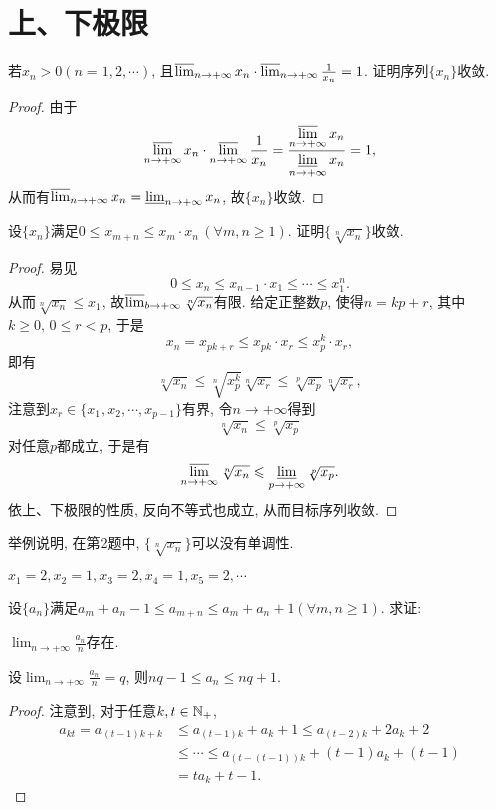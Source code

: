 \section{上、下极限}
\begin{quiza}
\woe 若\(x_n>0(n=1,2,\cdots)\), 且\(\varlimsup_{n\rightarrow+\infty}x_n\cdot\varlimsup_{n\rightarrow+\infty}\frac{1}{x_n}=1\). 证明序列\(\{x_n\}\)收敛.
\begin{proof}
由于\[\varlimsup_{n\rightarrow+\infty}x_n\cdot\varlimsup_{n\rightarrow+\infty}\frac{1}{x_n}=\frac{\displaystyle\varlimsup_{n\rightarrow+\infty}x_n}{\displaystyle\varliminf_{n\rightarrow+\infty}x_n}=1,\]从而有\(\varlimsup_{n\rightarrow+\infty}x_n=\varliminf_{n\rightarrow+\infty}x_n\), 故\(\{x_n\}\)收敛.
\end{proof}
\woe 设\(\{x_n\}\)满足\(0\leqslant x_{m+n}\leqslant x_{m}\cdot x_{n}\,(\forall m,n\geqslant 1)\). 证明\(\{\sqrt[n]{x_n}\}\)收敛.
\begin{proof}
易见\[0\leqslant x_n\leqslant x_{n-1}\cdot x_1\leqslant \cdots\leqslant x_1^n.\]从而\(\sqrt[n]{x_n}\leqslant x_1\), 故\(\varlimsup_{b\rightarrow+\infty}\sqrt[n]{x_n}\)有限. 给定正整数\(p\), 使得\(n=kp+r\), 其中\(k\geqslant 0,\, 0\leqslant r<p\), 于是\[x_n=x_{pk+r}\leqslant x_{pk}\cdot x_r\leqslant x_p^k\cdot x_r,\]即有\[\sqrt[n]{x_n}\leqslant \sqrt[n]{x_p^k}\sqrt[n]{x_r}\leqslant \sqrt[p]{x_p}\sqrt[n]{x_r},\]注意到\(x_r\in\{x_1,x_2,\cdots,x_{p-1}\}\)有界, 令\(n\rightarrow+\infty\)得到\[\sqrt[n]{x_n}\leqslant\sqrt[p]{x_p}\]对任意\(p\)都成立, 于是有\[\varlimsup_{n\rightarrow+\infty}\sqrt[n]{x_n}\leqslant\varliminf_{p\rightarrow+\infty}\sqrt[p]{x_p}.\]依上、下极限的性质, 反向不等式也成立, 从而目标序列收敛.
\end{proof}
\woe 举例说明, 在第2题中, \(\{\sqrt[n]{x_n}\}\)可以没有单调性.
\begin{solution}
\(x_1=2,x_2=1,x_3=2,x_4=1,x_5=2,\cdots\)
\end{solution}
\woe 设\(\{a_n\}\)满足\(a_m+a_n-1\leqslant a_{m+n}\leqslant a_m+a_n+1(\forall m,n\geqslant 1)\). 求证: 
\begin{quizs}
\item \(\lim_{n\rightarrow+\infty}\frac{a_n}{n}\)存在.
\item 设\(\lim_{n\rightarrow+\infty}\frac{a_n}{n}=q\), 则\(nq-1\leqslant a_n\leqslant nq+1\).
\end{quizs}
\begin{proof}
注意到, 对于任意\(k,t\in\mathbb{N}_+\),\[\begin{split}
a_{kt}=a_{(t-1)k+k}&\leqslant a_{(t-1)k}+a_k+1\leqslant a_{(t-2)k}+2a_k+2\\&\leqslant\cdots\leqslant a_{\left(t-(t-1)\right)k}+(t-1)a_k+(t-1)\\&=ta_k+t-1.
\end{split}\]


\end{proof}
\end{quiza}
